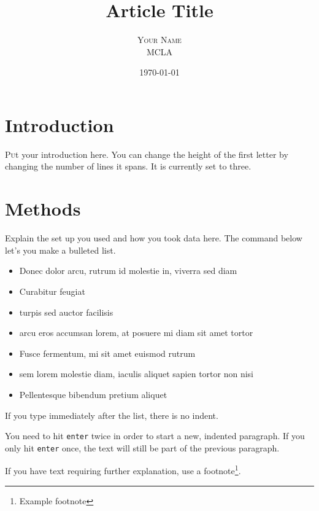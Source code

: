 \documentclass[twoside,twocolumn]{article}
\title{Article Title} %
\author{%
\textsc{Your Name}\\ %
\normalsize MCLA \\ %
}
\date{\today} %
\begin{document}
\maketitle


\section{Introduction}

\lettrine[nindent=0em,lines=3]{P} ut your introduction here. You can change the height of the first letter by changing the number of lines it spans. It is currently set to three.




\section{Methods}

Explain the set up you used and how you took data here. The command below let's you make a bulleted list. 

\begin{itemize}
\item Donec dolor arcu, rutrum id molestie in, viverra sed diam
\item Curabitur feugiat
\item turpis sed auctor facilisis
\item arcu eros accumsan lorem, at posuere mi diam sit amet tortor
\item Fusce fermentum, mi sit amet euismod rutrum
\item sem lorem molestie diam, iaculis aliquet sapien tortor non nisi
\item Pellentesque bibendum pretium aliquet
\end{itemize}
If you type immediately after the list, there is no indent.

You need to hit \texttt{enter} twice in order to start a new, indented paragraph. If you only hit \texttt{enter} once, the text will still be part of the previous paragraph.

If you have text requiring further explanation, use a footnote\footnote{Example footnote}.
\end{document}
